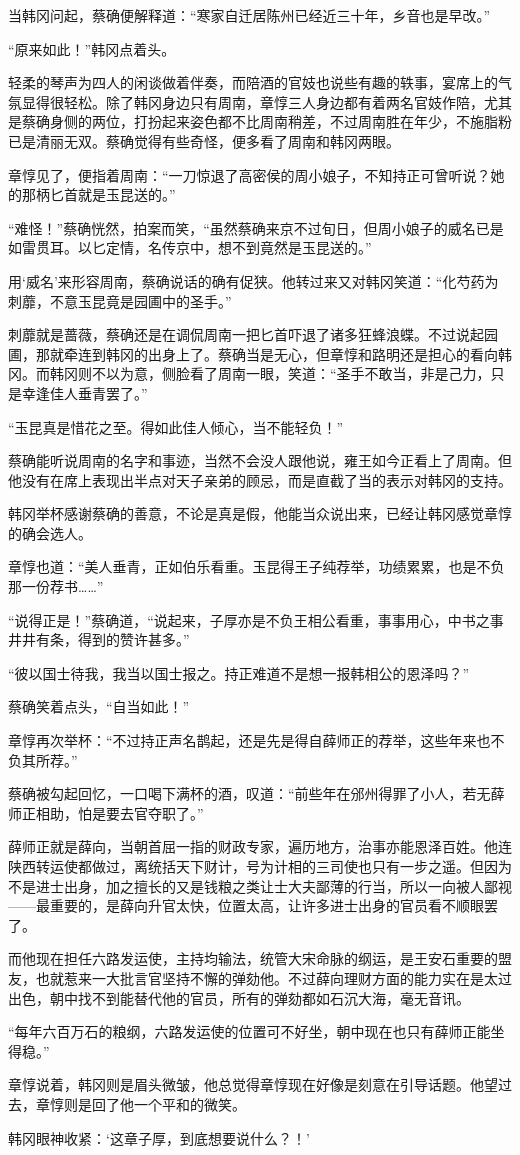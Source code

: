 当韩冈问起，蔡确便解释道：“寒家自迁居陈州已经近三十年，乡音也是早改。”

“原来如此！”韩冈点着头。

轻柔的琴声为四人的闲谈做着伴奏，而陪酒的官妓也说些有趣的轶事，宴席上的气氛显得很轻松。除了韩冈身边只有周南，章惇三人身边都有着两名官妓作陪，尤其是蔡确身侧的两位，打扮起来姿色都不比周南稍差，不过周南胜在年少，不施脂粉已是清丽无双。蔡确觉得有些奇怪，便多看了周南和韩冈两眼。

章惇见了，便指着周南：“一刀惊退了高密侯的周小娘子，不知持正可曾听说？她的那柄匕首就是玉昆送的。”

“难怪！”蔡确恍然，拍案而笑，“虽然蔡确来京不过旬日，但周小娘子的威名已是如雷贯耳。以匕定情，名传京中，想不到竟然是玉昆送的。”

用‘威名’来形容周南，蔡确说话的确有促狭。他转过来又对韩冈笑道：“化芍药为刺蘼，不意玉昆竟是园圃中的圣手。”

刺蘼就是蔷薇，蔡确还是在调侃周南一把匕首吓退了诸多狂蜂浪蝶。不过说起园圃，那就牵连到韩冈的出身上了。蔡确当是无心，但章惇和路明还是担心的看向韩冈。而韩冈则不以为意，侧脸看了周南一眼，笑道：“圣手不敢当，非是己力，只是幸逢佳人垂青罢了。”

“玉昆真是惜花之至。得如此佳人倾心，当不能轻负！”

蔡确能听说周南的名字和事迹，当然不会没人跟他说，雍王如今正看上了周南。但他没有在席上表现出半点对天子亲弟的顾忌，而是直截了当的表示对韩冈的支持。

韩冈举杯感谢蔡确的善意，不论是真是假，他能当众说出来，已经让韩冈感觉章惇的确会选人。

章惇也道：“美人垂青，正如伯乐看重。玉昆得王子纯荐举，功绩累累，也是不负那一份荐书……”

“说得正是！”蔡确道，“说起来，子厚亦是不负王相公看重，事事用心，中书之事井井有条，得到的赞许甚多。”

“彼以国士待我，我当以国士报之。持正难道不是想一报韩相公的恩泽吗？”

蔡确笑着点头，“自当如此！”

章惇再次举杯：“不过持正声名鹊起，还是先是得自薛师正的荐举，这些年来也不负其所荐。”

蔡确被勾起回忆，一口喝下满杯的酒，叹道：“前些年在邠州得罪了小人，若无薛师正相助，怕是要去官夺职了。”

薛师正就是薛向，当朝首屈一指的财政专家，遍历地方，治事亦能恩泽百姓。他连陕西转运使都做过，离统括天下财计，号为计相的三司使也只有一步之遥。但因为不是进士出身，加之擅长的又是钱粮之类让士大夫鄙薄的行当，所以一向被人鄙视——最重要的，是薛向升官太快，位置太高，让许多进士出身的官员看不顺眼罢了。

而他现在担任六路发运使，主持均输法，统管大宋命脉的纲运，是王安石重要的盟友，也就惹来一大批言官坚持不懈的弹劾他。不过薛向理财方面的能力实在是太过出色，朝中找不到能替代他的官员，所有的弹劾都如石沉大海，毫无音讯。

“每年六百万石的粮纲，六路发运使的位置可不好坐，朝中现在也只有薛师正能坐得稳。”

章惇说着，韩冈则是眉头微皱，他总觉得章惇现在好像是刻意在引导话题。他望过去，章惇则是回了他一个平和的微笑。

韩冈眼神收紧：‘这章子厚，到底想要说什么？！’

